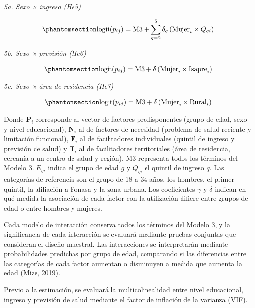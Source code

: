 \documentclass[
  spanish,
  a4paper,
  oneside]{scrbook}
\begin{document}
\emph{5a. Sexo × ingreso (He5)}

\begin{equation}\protect\phantomsection\label{eq-m5a}{
\text{logit}(p_{ij}) = \text{M3} + \sum_{q=2}^{5}\delta_{q}\,(\text{Mujer}_i\times Q_{qi})
}\end{equation}

\emph{5b. Sexo × previsión (He6)}

\begin{equation}\protect\phantomsection\label{eq-m5b}{
\text{logit}(p_{ij}) = \text{M3} + \delta\,(\text{Mujer}_i\times \text{Isapre}_i)
}\end{equation}

\emph{5c. Sexo × área de residencia (He7)}

\begin{equation}\protect\phantomsection\label{eq-m5c}{
\text{logit}(p_{ij}) = \text{M3} + \delta\,(\text{Mujer}_i\times \text{Rural}_i)
}\end{equation}

Donde \(\mathbf{P}_i\) corresponde al vector de factores predisponentes
(grupo de edad, sexo y nivel educacional), \(\mathbf{N}_i\) al de
factores de necesidad (problema de salud reciente y limitación
funcional), \(\mathbf{F}_i\) al de facilitadores individuales (quintil
de ingreso y previsión de salud) y \(\mathbf{T}_i\) al de facilitadores
territoriales (área de residencia, cercanía a un centro de salud y
región). M3 representa todos los términos del Modelo 3. \(E_{gi}\)
indica el grupo de edad \(g\) y \(Q_{qi}\) el quintil de ingreso \(q\).
Las categorías de referencia son el grupo de 18 a 34 años, los hombres,
el primer quintil, la afiliación a Fonasa y la zona urbana. Los
coeficientes \(\gamma\) y \(\delta\) indican en qué medida la asociación
de cada factor con la utilización difiere entre grupos de edad o entre
hombres y mujeres.

Cada modelo de interacción conserva todos los términos del Modelo 3, y
la significancia de cada interacción se evaluará mediante pruebas
conjuntas que consideran el diseño muestral. Las interacciones se
interpretarán mediante probabilidades predichas por grupo de edad,
comparando si las diferencias entre las categorías de cada factor
aumentan o disminuyen a medida que aumenta la edad (Mize, 2019).

Previo a la estimación, se evaluará la multicolinealidad entre nivel
educacional, ingreso y previsión de salud mediante el factor de
inflación de la varianza (VIF).
\end{document}
